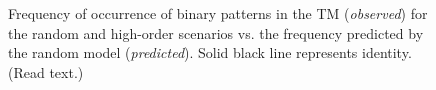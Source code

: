 \documentclass[11pt,letterpaper]{article}
\begin{document}
		    \begin{figure}[t]
			    \centering
			    \caption{
				    Frequency of occurrence
				    of binary patterns in the TM (\emph{observed}) for the random and
				    high-order scenarios vs. the frequency
				    predicted by the random model (\emph{predicted}).
				    Solid black line represents identity.
				    (Read text.)
			    }
			    \label{fig15}
		    \end{figure}
		    
\end{document}
